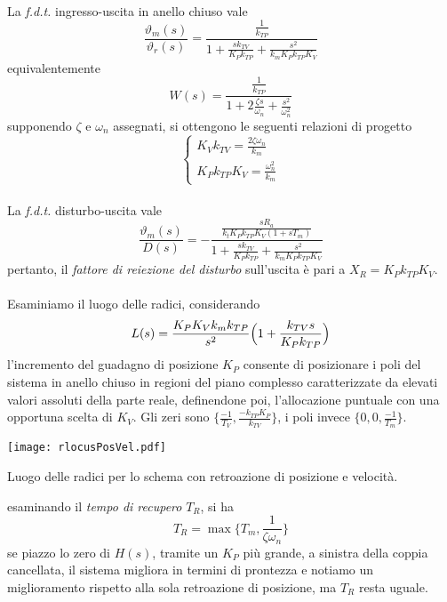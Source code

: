 \paragraph{}
La \emph{f.d.t.} ingresso-uscita in anello chiuso vale
\begin{equation}
	\frac{\vartheta_m(s)}{\vartheta_r(s)} = \frac{\frac{1}{k_{TP}}}{1+ \frac{sk_{TV}}{K_Pk_{TP}}+\frac{s^2}{k_mK_Pk_{TP}K_V}}
\end{equation}
equivalentemente 
\begin{equation}
	W(s) = \frac{\frac{1}{k_{TP}}}{1+2\frac{\zeta s}{\omega_n} + \frac{s^2}{\omega_n^2}}
\end{equation}
supponendo $\zeta$ e $\omega_n$ assegnati, si ottengono le seguenti relazioni di progetto
\begin{equation}
	\begin{cases}
		K_Vk_{TV} = \frac{2 \zeta \omega_n}{k_m} \\
		K_Pk_{TP}K_V = \frac{\omega_n^2}{k_m} 
	\end{cases}
\end{equation}

\paragraph{}
La \emph{f.d.t.} disturbo-uscita vale
\begin{equation}
	\frac{\vartheta_m(s)}{D(s)} = - \frac{\frac{s R_a}{k_tK_Pk_{TP}K_V(1+sT_m)}}{1+\frac{sk_{TV}}{K_Pk_{TP}}+\frac{s^2}{k_mK_Pk_{TP}K_V}}
\end{equation}
pertanto, il \emph{fattore di reiezione del disturbo} sull'uscita è pari a $X_R = K_P k_{TP}K_V$.

\paragraph{}
Esaminiamo il luogo delle radici, considerando
\begin{equation}
	L(s) = \frac{K_P K_V k_m k_{TP}}{s^2} \Bigr( 1 + \frac{k_{TV}s}{K_P k_{TP}} \Bigl)
\end{equation}
l'incremento del guadagno di posizione $K_P$ consente di posizionare i poli del sistema in anello chiuso in regioni del piano complesso caratterizzate da elevati valori assoluti della parte reale, definendone poi, l'allocazione puntuale con una opportuna scelta di $K_V$. Gli zeri sono $\lbrace \frac{-1}{T_V}, \frac{-k_{TP}K_P}{k_{TV}} \rbrace$, i poli invece $\lbrace 0,0,\frac{-1}{T_m} \rbrace$.
\begin{center}
	\texttt{[image: rlocusPosVel.pdf]}
	\caption{Luogo delle radici per lo schema con retroazione di posizione e velocità.}
\end{center} 
esaminando il \emph{tempo di recupero} $T_R$, si ha
\begin{equation}
	T_R = \max \lbrace T_m, \frac{1}{\zeta \omega_n} \rbrace 
\end{equation}
se piazzo lo zero di $H(s)$, tramite un $K_P$ più grande, a sinistra della coppia cancellata, il sistema migliora in termini di prontezza e notiamo un miglioramento rispetto alla sola retroazione di posizione, ma $T_R$ resta uguale.

